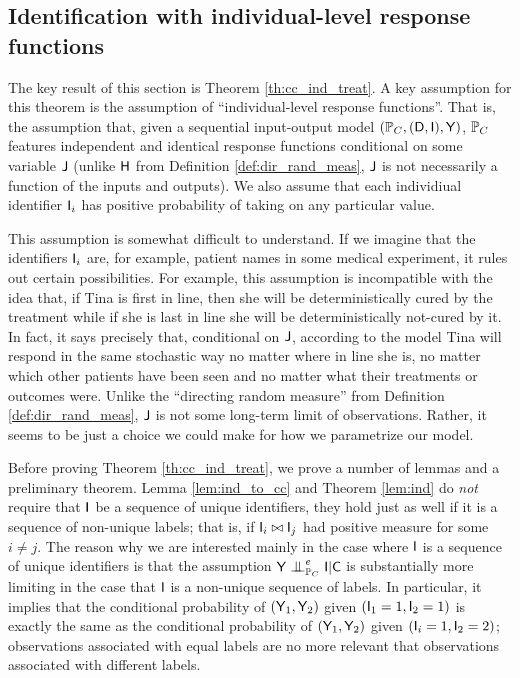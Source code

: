 \subsection[Identification]{Identification with individual-level response functions}

The key result of this section is Theorem \ref{th:cc_ind_treat}. A key assumption for this theorem is the assumption of ``individual-level response functions''. That is, the assumption that, given a sequential input-output model $(\mathbb{P}_C, (\mathsf{D},\mathsf{I}),\mathsf{Y})$, $\mathbb{P}_C$ features independent and identical response functions conditional on some variable $\mathsf{J}$ (unlike $\mathsf{H}$ from Definition \ref{def:dir_rand_meas}, $\mathsf{J}$ is not necessarily a function of the inputs and outputs). We also assume that each individiual identifier $\mathsf{I}_i$ has positive probability of taking on any particular value.

This assumption is somewhat difficult to understand. If we imagine that the identifiers $\mathsf{I}_i$ are, for example, patient names in some medical experiment, it rules out certain possibilities. For example, this assumption is incompatible with the idea that, if Tina is first in line, then she will be deterministically cured by the treatment while if she is last in line she will be deterministically not-cured by it. In fact, it says precisely that, conditional on $\mathsf{J}$, according to the model Tina will respond in the same stochastic way no matter where in line she is, no matter which other patients have been seen and no matter what their treatments or outcomes were. Unlike the ``directing random measure'' from Definition \ref{def:dir_rand_meas}, $\mathsf{J}$ is not some long-term limit of observations. Rather, it seems to be just a choice we could make for how we parametrize our model.

Before proving Theorem \ref{th:cc_ind_treat}, we prove a number of lemmas and a preliminary theorem. Lemma \ref{lem:ind_to_cc} and Theorem \ref{lem:ind} do \emph{not} require that $\mathsf{I}$ be a sequence of unique identifiers, they hold just as well if it is a sequence of non-unique labels; that is, if $\mathsf{I}_i\bowtie \mathsf{I}_j$ had positive measure for some $i\neq j$. The reason why we are interested mainly in the case where $\mathsf{I}$ is a sequence of unique identifiers is that the assumption $\RV{Y}\CI^e_{\prob{P}_C} \RV{I}|\RV{C}$ is substantially more limiting in the case that $\mathsf{I}$ is a non-unique sequence of labels. In particular, it implies that the conditional probability of $(\mathsf{Y}_1,\mathsf{Y}_2)$ given $(\mathsf{I}_1=1,\mathsf{I}_2=1)$ is exactly the same as the conditional probability of $(\mathsf{Y}_1,\mathsf{Y}_2)$ given $(\mathsf{I}_i=1,\mathsf{I}_2=2)$; observations associated with equal labels are no more relevant that observations associated with different labels.

